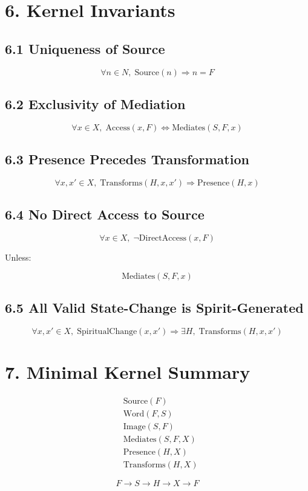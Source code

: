 \documentclass[12pt]{article}
\begin{document}
\section*{6. Kernel Invariants}

\subsection*{6.1 Uniqueness of Source}

\[
\forall n \in N,\; \mathrm{Source}(n) \Rightarrow n = F
\]

\subsection*{6.2 Exclusivity of Mediation}

\[
\forall x \in X,\; \mathrm{Access}(x,F) \Leftrightarrow \mathrm{Mediates}(S,F,x)
\]

\subsection*{6.3 Presence Precedes Transformation}

\[
\forall x,x' \in X,\; \mathrm{Transforms}(H,x,x') \Rightarrow \mathrm{Presence}(H,x)
\]

\subsection*{6.4 No Direct Access to Source}

\[
\forall x \in X,\; \neg \mathrm{DirectAccess}(x,F)
\]

Unless:

\[
\mathrm{Mediates}(S,F,x)
\]

\subsection*{6.5 All Valid State-Change is Spirit-Generated}

\[
\forall x,x' \in X,\; \mathrm{SpiritualChange}(x,x') \Rightarrow \exists H,\; \mathrm{Transforms}(H,x,x')
\]

\section*{7. Minimal Kernel Summary}

\[
\begin{aligned}
&\mathrm{Source}(F) \\
&\mathrm{Word}(F,S) \\
&\mathrm{Image}(S,F) \\
&\mathrm{Mediates}(S,F,X) \\
&\mathrm{Presence}(H,X) \\
&\mathrm{Transforms}(H,X)
\end{aligned}
\]

\[
F \rightarrow S \rightarrow H \rightarrow X \rightarrow F
\]
\end{document}
